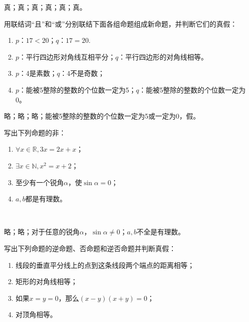 \documentclass[lang=cn,newtx,10pt,scheme=chinese]{elegantbook}
\begin{document}
\begin{solution}
  真；真；真；真；真；真。
\end{solution}

\begin{exercise}
  用联结词“且”和“或”分别联结下面各组命题组成新命题，并判断它们的真假：
\end{exercise}

\begin{enumerate}
  \item $p$：$17<20$；$q$：$17=20$.
  \item $p$：平行四边形对角线互相平分；$q$：平行四边形的对角线相等。
  \item $p$：4是素数；$q$：4不是奇数；
  \item $p$：能被5整除的整数的个位数一定为5；$q$：能被5整除的整数的个位数一定为0。
\end{enumerate}

\begin{solution}
  略；略；略；能被5整除的整数的个位数一定为5或一定为0，假。
\end{solution}

\begin{exercise}
  写出下列命题的非：
\end{exercise}

\begin{enumerate}
  \item $\forall x\in\mathbb{R},3x=2x+x$；
  \item $\exists x\in\mathbb{N},x^2=x+2$；
  \item 至少有一个锐角$\alpha$，使$\sin\alpha=0$；
  \item $a,b$都是有理数。
\end{enumerate}\

\begin{solution}
  略；略；对于任意的锐角$\alpha$，$\sin\alpha\neq 0$；$a,b$不全是有理数。
\end{solution}

\begin{exercise}
  写出下列命题的逆命题、否命题和逆否命题并判断真假：
\end{exercise}

\begin{enumerate}
  \item 线段的垂直平分线上的点到这条线段两个端点的距离相等；
  \item 矩形的对角线相等；
  \item 如果$x=y=0$，那么$(x-y)(x+y)=0$；
  \item 对顶角相等。
\end{enumerate}
\end{document}
